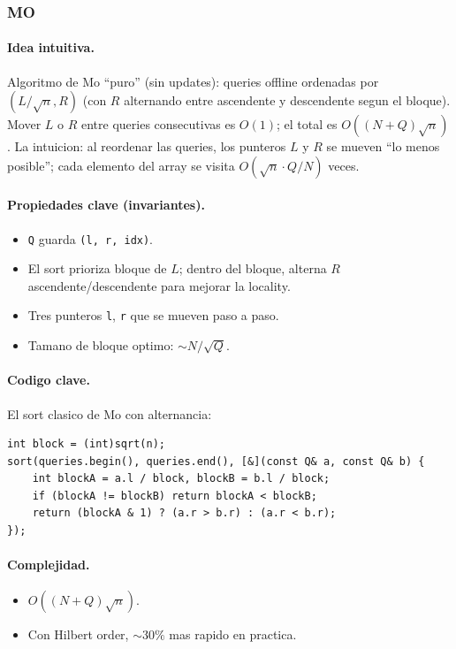 ﻿\subsubsection{MO}

\paragraph{Idea intuitiva.}
Algoritmo de Mo ``puro'' (sin updates): queries offline ordenadas por $(L/\sqrt{n}, R)$ (con $R$ alternando entre ascendente y descendente segun el bloque). Mover $L$ o $R$ entre queries consecutivas es $O(1)$; el total es $O((N + Q) \sqrt{n})$. La intuicion: al reordenar las queries, los punteros $L$ y $R$ se mueven ``lo menos posible''; cada elemento del array se visita $O(\sqrt{n} \cdot Q/N)$ veces.

\paragraph{Propiedades clave (invariantes).}
\begin{itemize}\setlength\itemsep{0pt}
	\item \texttt{Q} guarda \texttt{(l, r, idx)}.
	\item El sort prioriza bloque de $L$; dentro del bloque, alterna $R$ ascendente/descendente para mejorar la locality.
	\item Tres punteros \texttt{l}, \texttt{r} que se mueven paso a paso.
	\item Tamano de bloque optimo: $\sim N / \sqrt{Q}$.
\end{itemize}

\paragraph{Codigo clave.}
El sort clasico de Mo con alternancia:
\begin{verbatim}
int block = (int)sqrt(n);
sort(queries.begin(), queries.end(), [&](const Q& a, const Q& b) {
    int blockA = a.l / block, blockB = b.l / block;
    if (blockA != blockB) return blockA < blockB;
    return (blockA & 1) ? (a.r > b.r) : (a.r < b.r);
});
\end{verbatim}

\paragraph{Complejidad.}
\begin{itemize}\setlength\itemsep{0pt}
	\item $O((N + Q) \sqrt{n})$.
	\item Con Hilbert order, $\sim 30\%$ mas rapido en practica.
\end{itemize}

